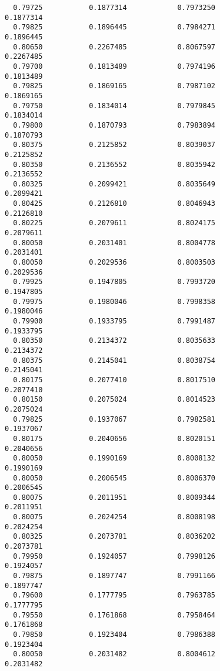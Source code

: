 \documentclass[
  letterpaper,
  DIV=11,
  numbers=noendperiod]{scrartcl}
\begin{document}
\begin{verbatim}
  0.79725           0.1877314            0.7973250            0.1877314     
  0.79825           0.1896445            0.7984271            0.1896445     
  0.80650           0.2267485            0.8067597            0.2267485     
  0.79700           0.1813489            0.7974196            0.1813489     
  0.79825           0.1869165            0.7987102            0.1869165     
  0.79750           0.1834014            0.7979845            0.1834014     
  0.79800           0.1870793            0.7983894            0.1870793     
  0.80375           0.2125852            0.8039037            0.2125852     
  0.80350           0.2136552            0.8035942            0.2136552     
  0.80325           0.2099421            0.8035649            0.2099421     
  0.80425           0.2126810            0.8046943            0.2126810     
  0.80225           0.2079611            0.8024175            0.2079611     
  0.80050           0.2031401            0.8004778            0.2031401     
  0.80050           0.2029536            0.8003503            0.2029536     
  0.79925           0.1947805            0.7993720            0.1947805     
  0.79975           0.1980046            0.7998358            0.1980046     
  0.79900           0.1933795            0.7991487            0.1933795     
  0.80350           0.2134372            0.8035633            0.2134372     
  0.80375           0.2145041            0.8038754            0.2145041     
  0.80175           0.2077410            0.8017510            0.2077410     
  0.80150           0.2075024            0.8014523            0.2075024     
  0.79825           0.1937067            0.7982581            0.1937067     
  0.80175           0.2040656            0.8020151            0.2040656     
  0.80050           0.1990169            0.8008132            0.1990169     
  0.80050           0.2006545            0.8006370            0.2006545     
  0.80075           0.2011951            0.8009344            0.2011951     
  0.80075           0.2024254            0.8008198            0.2024254     
  0.80325           0.2073781            0.8036202            0.2073781     
  0.79950           0.1924057            0.7998126            0.1924057     
  0.79875           0.1897747            0.7991166            0.1897747     
  0.79600           0.1777795            0.7963785            0.1777795     
  0.79550           0.1761868            0.7958464            0.1761868     
  0.79850           0.1923404            0.7986388            0.1923404     
  0.80050           0.2031482            0.8004612            0.2031482     

\end{verbatim}
\end{document}
